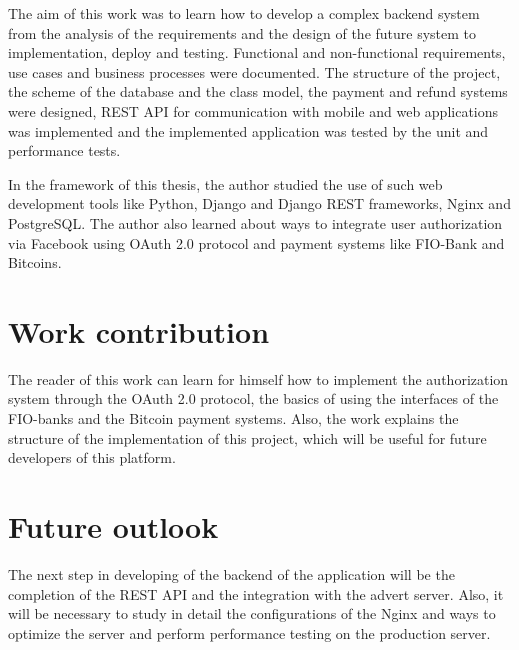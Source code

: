 The aim of this work was to learn how to develop a complex backend system from the analysis of the requirements and the design of the future system to implementation, deploy and testing. Functional and non-functional requirements, use cases and business processes were documented. The structure of the project, the scheme of the database and the class model, the payment and refund systems were designed, REST API for communication with mobile and web applications was implemented and the implemented application was tested by the unit and performance tests.

In the framework of this thesis, the author studied the use of such web development tools like Python, Django and Django REST frameworks, Nginx and PostgreSQL. The author also learned about ways to integrate user authorization via Facebook using OAuth 2.0 protocol and payment systems like FIO-Bank and Bitcoins.


\section{Work contribution}
The reader of this work can learn for himself how to implement the authorization system through the OAuth 2.0 protocol, the basics of using the interfaces of the FIO-banks and the Bitcoin payment systems. Also, the work explains the structure of the implementation of this project, which will be useful for future developers of this platform.

\section{Future outlook}
The next step in developing of the backend of the application will be the completion of the REST API and the integration with the advert server. Also, it will be necessary to study in detail the configurations of the Nginx and ways to optimize the server and perform performance testing on the production server.
